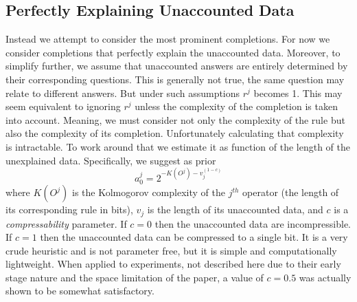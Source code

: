 \documentclass[runningheads]{llncs}
\begin{document}
\subsection{Perfectly Explaining Unaccounted Data}
Instead we attempt to consider the most prominent completions.  For
now we consider completions that perfectly explain the unaccounted
data. Moreover, to simplify further, we assume that unaccounted
answers are entirely determined by their corresponding questions. This
is generally not true, the same question may relate to different
answers. But under such assumptions $r^j$ becomes 1. This may seem
equivalent to ignoring $r^j$ unless the complexity of the completion
is taken into account. Meaning, we must consider not only the
complexity of the rule but also the complexity of its
completion. Unfortunately calculating that complexity is
intractable. To work around that we estimate it as function of the
length of the unexplained data. Specifically, we suggest as prior
\begin{equation}
a^j_0 = 2^{-K(O^j) - v_j^{(1-c)}}
\end{equation}
where $K(O^j)$ is the Kolmogorov complexity of the $j^{th}$ operator
(the length of its corresponding rule in bits), $v_j$ is the length of
its unaccounted data, and $c$ is a \emph{compressability}
parameter. If $c=0$ then the unaccounted data are incompressible. If
$c=1$ then the unaccounted data can be compressed to a single bit. It
is a very crude heuristic and is not parameter free, but it is simple
and computationally lightweight. When applied to experiments, not
described here due to their early stage nature and the space
limitation of the paper, a value of $c=0.5$ was actually shown to be
somewhat satisfactory.
\end{document}
